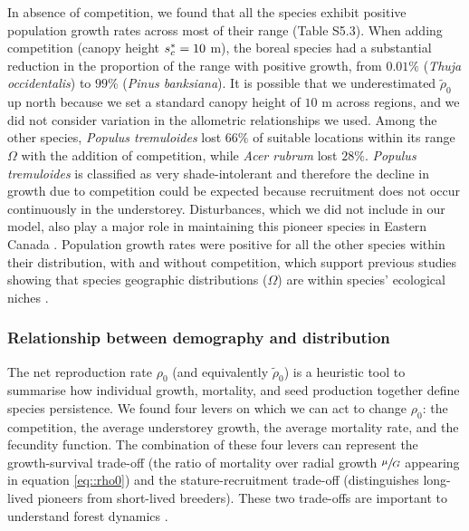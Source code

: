 In absence of competition, we found that all the species exhibit positive population growth rates across most of their range (Table S5.3). When adding competition (canopy height $ {s}^{*}_c = 10 $ m), the boreal species had a substantial reduction in the proportion of the range with positive growth, from $ 0.01 \% $ (\textit{Thuja occidentalis}) to $ 99 \% $ (\textit{Pinus banksiana}). It is possible that we underestimated $ \tilde \rho_0 $ up north because we set a standard canopy height of $ 10 $ m across regions, and we did not consider variation in the allometric relationships we used. Among the other species, \textit{Populus tremuloides} lost $ 66 \% $ of suitable locations within its range $ \Omega $ with the addition of competition, while \textit{Acer rubrum} lost $ 28 \% $. \textit{Populus tremuloides} is classified as very shade-intolerant \citep{Burns1990a} and therefore the decline in growth due to competition could be expected because recruitment does not occur continuously in the understorey. Disturbances, which we did not include in our model, also play a major role in maintaining this pioneer species in Eastern Canada \citep{Nlungu-Kweta2017}. Population growth rates were positive for all the other species within their distribution, with and without competition, which support previous studies showing that species geographic distributions ($ \Omega $) are within species' ecological niches \citep{Lee-Yaw2016, Csergo2017}.

\subsubsection{Relationship between demography and distribution}
The net reproduction rate $ \rho_0 $ (and equivalently $ \tilde \rho_0 $) is a heuristic tool to summarise how individual growth, mortality, and seed production together define species persistence. We found four levers on which we can act to change $ \rho_0 $: the competition, the average understorey growth, the average mortality rate, and the fecundity function. The combination of these four levers can represent the growth-survival trade-off (\eg the ratio of mortality over radial growth $ \sfrac{\mu}{G} $ appearing in equation \eqref{eq::rho0}) and the stature-recruitment trade-off (distinguishes long-lived pioneers from short-lived breeders). These two trade-offs are important to understand forest dynamics \citep[for tropical forest]{Ruger2020}. \\

